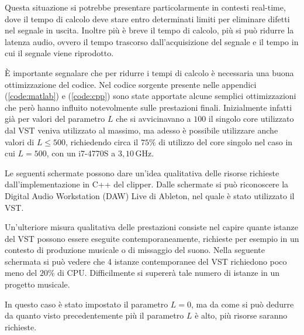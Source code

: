 		Questa situazione si potrebbe presentare particolarmente in contesti real-time, dove il tempo di calcolo deve stare entro determinati limiti per eliminare difetti nel segnale in uscita. Inoltre più è breve il tempo di calcolo, più si può ridurre la latenza audio, ovvero il tempo trascorso dall'acquisizione del segnale e il tempo in cui il segnale viene riprodotto.
		
		È importante segnalare che per ridurre i tempi di calcolo è necessaria una buona ottimizzazione del codice. Nel codice sorgente presente nelle appendici (\ref{code:matlab}) e (\ref{code:cpp}) sono state apportate alcune semplici ottimizzazioni che però hanno influito notevolmente sulle prestazioni finali. Inizialmente infatti già per valori del parametro $L$ che si avvicinavano a $100$ il singolo core utilizzato dal VST veniva utilizzato al massimo, ma adesso è possibile utilizzare anche valori di $L \le 500$, richiedendo circa il $75\%$ di utilizzo del core singolo nel caso in cui $L = 500$, con un i7-4770S a $3,10\,$GHz.
		
		Le seguenti schermate possono dare un'idea qualitativa delle risorse richieste dall'implementazione in C++ del clipper. Dalle schermate si può riconoscere la Digital Audio Workstation (DAW) Live di Ableton, nel quale è stato utilizzato il VST.
		
		\pagebreak
		\vspace*{-35px}
		\vspace*{-10px}
		\pagebreak
		
		Un'ulteriore misura qualitativa delle prestazioni consiste nel capire quante istanze del VST possono essere eseguite contemporaneamente, richieste per esempio in un contesto di produzione musicale o di missaggio del suono. Nella seguente schermata si può vedere che 4 istanze contemporanee del VST richiedono poco meno del $20\%$ di CPU. Difficilmente si supererà tale numero di istanze in un progetto musicale.
		
		
		In questo caso è stato impostato il parametro $L = 0$, ma da come si può dedurre da quanto visto precedentemente più il parametro $L$ è alto, più risorse saranno richieste.
		
		
